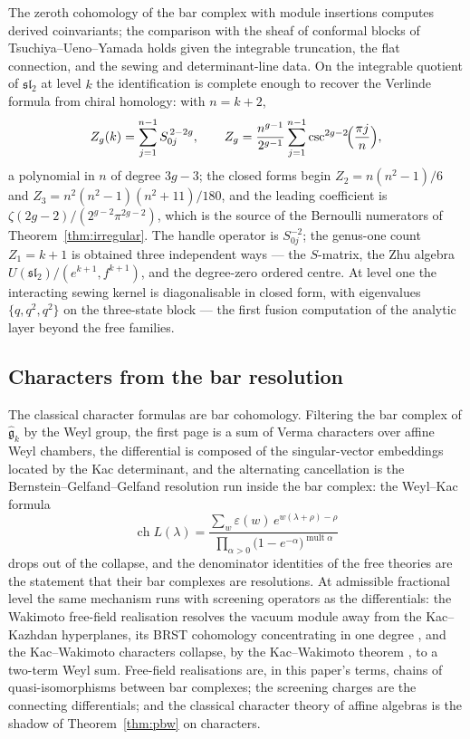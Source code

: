 \documentclass[11pt]{amsart}
\numberwithin{equation}{section}
\theoremstyle{plain}
\theoremstyle{definition}
\theoremstyle{remark}
\newcommand{\fg}{\mathfrak{g}}
\begin{document}
The zeroth cohomology of the bar complex with module insertions
computes derived coinvariants; the comparison with the sheaf of
conformal blocks of Tsuchiya--Ueno--Yamada \cite{TUY} holds given the integrable
truncation, the flat connection, and the sewing and determinant-line
data. On the integrable
quotient of $\widehat{\mathfrak{sl}}_2$ at level $k$ the identification
is complete enough to recover the Verlinde formula \cite{Verlinde} from chiral
homology: with $n=k+2$,
\begin{equation}
Z_g(k)=\sum_{j=1}^{n-1}S_{0j}^{\,2-2g},
\qquad
Z_g=\frac{n^{g-1}}{2^{g-1}}\sum_{j=1}^{n-1}
\csc^{2g-2}\!\Bigl(\frac{\pi j}{n}\Bigr),
\end{equation}
a polynomial in $n$ of degree $3g-3$; the closed forms begin
$Z_2=n(n^{2}-1)/6$ and $Z_3=n^{2}(n^{2}-1)(n^{2}+11)/180$, and the
leading coefficient is $\zeta(2g-2)/(2^{g-2}\pi^{2g-2})$, which is the
source of the Bernoulli numerators of Theorem~\ref{thm:irregular}. The
handle operator is $S_{0j}^{-2}$; the genus-one count $Z_1=k+1$ is
obtained three independent ways --- the $S$-matrix, the Zhu algebra \cite{Zhu}
$U(\mathfrak{sl}_2)/(e^{k+1},f^{k+1})$, and the degree-zero ordered
centre. At level one the interacting sewing kernel is diagonalisable in
closed form, with eigenvalues $\{q,q^{2},q^{2}\}$ on the three-state
block --- the first fusion computation of the analytic layer beyond the
free families.

\subsection{Characters from the bar resolution}

The classical character formulas are bar cohomology. Filtering the
bar complex of $\widehat{\fg}_k$ by the Weyl group, the first page is
a sum of Verma characters over affine Weyl chambers, the differential
is composed of the singular-vector embeddings located by the Kac
determinant, and the alternating cancellation is the
Bernstein--Gelfand--Gelfand resolution run inside the bar complex:
the Weyl--Kac formula
\begin{equation}
\operatorname{ch}L(\lambda)
=\frac{\sum_{w}\varepsilon(w)\,e^{w(\lambda+\rho)-\rho}}
{\prod_{\alpha>0}\bigl(1-e^{-\alpha}\bigr)^{\operatorname{mult}\alpha}}
\end{equation}
drops out of the collapse, and the denominator identities of the free
theories are the statement that their bar complexes are resolutions.
At admissible fractional level the same mechanism runs with screening
operators as the differentials: the Wakimoto free-field realisation \cite{Wakimoto}
resolves the vacuum module away from the Kac--Kazhdan hyperplanes,
its BRST cohomology concentrating in one degree \cite{Arakawa}, and the
Kac--Wakimoto characters collapse, by the Kac--Wakimoto theorem \cite{KW}, to a
two-term Weyl sum. Free-field realisations are, in this paper's terms, chains
of quasi-isomorphisms between bar complexes; the screening charges
are the connecting differentials; and the classical character theory
of affine algebras is the shadow of Theorem~\ref{thm:pbw} on
characters.
\end{document}

